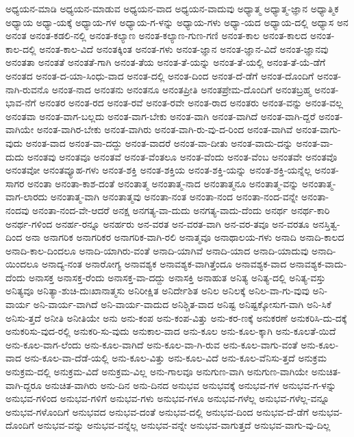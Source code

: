 {ಅಧ್ಯಯನ-ಮಾಡಿ
ಅಧ್ಯಯನ-ಮಾಡುವ
ಅಧ್ಯಯನ-ವಾದ
ಅಧ್ಯಯನ-ವಾದುವು
ಅಧ್ಯಾತ್ಮ
ಅಧ್ಯಾತ್ಮ-ಜ್ಞಾನ
ಅಧ್ಯಾತ್ಮಿಕ
ಅಧ್ಯಾಯ
ಅಧ್ಯಾ-ಯಕ್ಕೆ
ಅಧ್ಯಾಯ-ಗಳ
ಅಧ್ಯಾಯ-ಗ-ಳನ್ನು
ಅಧ್ಯಾಯ-ಗಳು
ಅಧ್ಯಾ-ಯದ
ಅಧ್ಯಾಯ-ದಲ್ಲಿ
ಅಧ್ಯಾಸ
ಅನ
ಅನಂತ
ಅನಂತ-ಕಡಲಿ-ನಲ್ಲಿ
ಅನಂತ-ಕಲ್ಯಾಣ
ಅನಂತ-ಕಲ್ಯಾಣ-ಗುಣ-ಗಣಿ
ಅನಂತ-ಕಾಲ
ಅನಂತ-ಕಾಲದ
ಅನಂತ-ಕಾಲ-ದಲ್ಲಿ
ಅನಂತ-ಕಾಲ-ವಿದೆ
ಅನಂತಕ್ಕಿಂತ
ಅನಂತ-ಗಳು
ಅನಂತ-ಜ್ಞಾನ
ಅನಂತ-ಜ್ಞಾನ-ವಿದೆ
ಅನಂತ-ಜ್ಞಾನವು
ಅನಂತತಾ
ಅನಂತತೆ
ಅನಂತತೆ-ಗಾಗಿ
ಅನಂತ-ತೆಯ
ಅನಂತ-ತೆ-ಯನ್ನು
ಅನಂತ-ತೆ-ಯಲ್ಲಿ
ಅನಂತ-ತೆ-ಯೆ-ಡೆಗೆ
ಅನಂತದ
ಅನಂತ-ದ-ಯಾ-ಸಿಂಧು-ವಾದ
ಅನಂತ-ದಲ್ಲಿ
ಅನಂತ-ದಿಂದ
ಅನಂತ-ದೆ-ಡೆಗೆ
ಅನಂತ-ದೊಂದಿಗೆ
ಅನಂತ-ನಾಗಿ-ರುವನೊ
ಅನಂತ-ನಾದ
ಅನಂತನು
ಅನಂತನೂ
ಅನಂತಪ್ರೀತಿ
ಅನಂತಪ್ರೇಮ-ದೊಂದಿಗೆ
ಅನಂತಬ್ರಹ್ಮ
ಅನಂತ-ಭಾವ-ನೆಗೆ
ಅನಂತರ
ಅನಂತ-ರದ
ಅನಂತ-ರವೆ
ಅನಂತ-ರವೇ
ಅನಂತ-ರಾದ
ಅನಂತರು
ಅನಂತ-ವನ್ನು
ಅನಂತ-ವಲ್ಲ
ಅನಂತವಾ
ಅನಂತ-ವಾಗ-ಬಲ್ಲದು
ಅನಂತ-ವಾಗ-ಬೇಕು
ಅನಂತ-ವಾಗಿ
ಅನಂತ-ವಾಗಿದೆ
ಅನಂತ-ವಾಗಿ-ದ್ದರೆ
ಅನಂತ-ವಾಗಿಯೇ
ಅನಂತ-ವಾಗಿರ-ಬೇಕು
ಅನಂತ-ವಾಗಿರು
ಅನಂತ-ವಾಗಿ-ರು-ವು-ದ-ರಿಂದ
ಅನಂತ-ವಾಗಿವೆ
ಅನಂತ-ವಾಗು-ವುದು
ಅನಂತ-ವಾದ
ಅನಂತ-ವಾ-ದದ್ದು
ಅನಂತ-ವಾದರೆ
ಅನಂತ-ವಾ-ದೀತು
ಅನಂತ-ವಾದು-ದನ್ನು
ಅನಂತ-ವಾ-ದುದು
ಅನಂತವು
ಅನಂತವೂ
ಅನಂತವೆ
ಅನಂತ-ವೆಂತಲೂ
ಅನಂತ-ವೆಂದು
ಅನಂತ-ವೆಂಬ
ಅನಂತವೇ
ಅನಂತವೊ
ಅನಂತವೋ
ಅನಂತವ್ಯೂಹ-ಗಳು
ಅನಂತ-ಶಕ್ತಿ
ಅನಂತ-ಶಕ್ತಿಯ
ಅನಂತ-ಶಕ್ತಿ-ಯನ್ನು
ಅನಂತ-ಶಕ್ತಿ-ಯನ್ನೆಲ್ಲ
ಅನಂತ-ಸಾಗರ
ಅನಂತಾ
ಅನಂತಾ-ಕಾಶ-ದಂತೆ
ಅನಂತಾತ್ಮ
ಅನಂತಾತ್ಮ-ನಾದ
ಅನಂತಾತ್ಮನೂ
ಅನಂತಾತ್ಮ-ವನ್ನು
ಅನಂತಾತ್ಮ-ವಾಗ-ಲಾರದು
ಅನಂತಾತ್ಮ-ವಾಗಿ
ಅನಂತಾತ್ಮವು
ಅನಂತಾ-ನಂತ
ಅನಂತಾ-ನಂದ
ಅನಂತಾ-ನಂದ-ವನ್ನೇ
ಅನಂತಾ-ನಂದವು
ಅನಂತಾ-ನಂದ-ವೇ-ಆದರೆ
ಅನಕ್ಷ
ಅನಗತ್ಯ-ವಾ-ದುದು
ಅನಗತ್ಯ-ವಾದು-ದೆಂದು
ಅನರ್ಥ
ಅನರ್ಥ-ಕಾರಿ
ಅನರ್ಥ-ಗಳಿಂದ
ಅನರ್ಹ-ರನ್ನೂ
ಅನರ್ಹರು
ಅನ-ವರತ
ಅನ-ವರತ-ವಾಗಿ
ಅನ-ವರ-ತವೂ
ಅನ-ವರತೂ
ಅನಸ್ತಿತ್ವ-ದಿಂದ
ಅನಾ
ಅನಾಗರಿಕ
ಅನಾಗರಿಕರ
ಅನಾಗರಿಕ-ವಾಗಿ-ರಲಿ
ಅನಾತ್ಮವೂ
ಅನಾಥಾಲಯ-ಗಳು
ಅನಾದಿ
ಅನಾದಿ-ಕಾಲದ
ಅನಾದಿ-ಕಾಲ-ದಿಂದಲೂ
ಅನಾದಿ-ಯಾಗಿರು-ವಂತೆ
ಅನಾದಿ-ಯಾಗಿವೆ
ಅನಾದಿ-ಯಾದ
ಅನಾದಿ-ಯಾದುವು
ಅನಾದಿ-ಯಿಂದಲೂ
ಅನಾದ್ಯ-ನಂತ
ಅನಾರೋಗ್ಯ
ಅನಾವಶ್ಯಕ
ಅನಾವಶ್ಯಕ-ವಾಗಿತ್ತೆಂದೂ
ಅನಾವಶ್ಯಕ-ವಾದ
ಅನಾವಶ್ಯಕ-ವಾದು-ದೆಂದು
ಅನಾಸಕ್ತ
ಅನಾಸಕ್ತ-ರೆಂದು
ಅನಾಸಕ್ತ-ವಾ-ದದ್ದು
ಅನಾಸಕ್ತಿ
ಅನಾಹುತ
ಅನಿತ್ಯ
ಅನಿತ್ಯ-ದಲ್ಲಿ
ಅನಿತ್ಯ-ವಸ್ತು
ಅನಿತ್ಯವೂ
ಅನಿತ್ಯಾ-ಶುಚಿ-ದುಃಖಾನಾತ್ಮಸು
ಅನಿರೀಕ್ಷಿತ
ಅನಿರ್ದೇಶಿತ
ಅನಿಲ
ಅನಿಲಕ್ಕೆ
ಅನಿಲ-ವಾ-ಗು-ವುವು
ಅನಿ-ವಾರ್ಯ
ಅನಿ-ವಾರ್ಯ-ವಾಗಿದೆ
ಅನಿ-ವಾರ್ಯ-ವಾದುದ
ಅನಿಶ್ಚಿತ-ವಾದ
ಅನಿಷ್ಟ
ಅನಿಷ್ಟಕ್ಕೋಸುಗ-ವಾಗಿ
ಅನಿ-ಸಿಕೆ
ಅನಿಸು-ತ್ತದೆ
ಅನೀತಿ
ಅನೀತಿಯೇ
ಅನು
ಅನು-ಕಂಪ
ಅನು-ಕಂಪ-ವಿತ್ತು
ಅನು-ಕರ-ಣಕ್ಕೆ
ಅನುಕರಣೆ
ಅನುಕರಿಸಿ-ದು-ದಕ್ಕೆ
ಅನುಕರಿಸು-ವುದ-ರಲ್ಲಿ
ಅನುಕರಿ-ಸು-ವುದು
ಅನುಕಾಲ-ವಾದ
ಅನು-ಕೂಲ
ಅನು-ಕೂಲ-ಕ್ಕಾಗಿ
ಅನು-ಕೂಲತೆ-ಯಿದೆ
ಅನು-ಕೂಲ-ವಾಗ-ಲೆಂದು
ಅನು-ಕೂಲ-ವಾಗಿದೆ
ಅನು-ಕೂಲ-ವಾ-ಗಿ-ರುವ
ಅನು-ಕೂಲ-ವಾಗು-ವಂತೆ
ಅನು-ಕೂಲ-ವಾದ
ಅನು-ಕೂಲ-ವಾ-ದೆಡೆ-ಯಲ್ಲಿ
ಅನು-ಕೂಲ-ವಿತ್ತು
ಅನು-ಕೂಲ-ವಿದೆ
ಅನು-ಕೂಲ-ವೆನಿಸು-ತ್ತದೆ
ಅನುಕ್ರಮ
ಅನುಕ್ರಮ-ದಲ್ಲಿ
ಅನುಕ್ರಮ-ವಿದೆ
ಅನುಕ್ರಮ-ವಿಲ್ಲ
ಅನು-ಗಾಲವೂ
ಅನುಗುಣ-ವಾಗಿ
ಅನುಗುಣ-ವಾಗಿಯೇ
ಅನುಚಿತ-ವಾಗಿ-ದ್ದರೂ
ಅನುಚಿತ-ವಾಗಿರು
ಅನು-ದಿನ
ಅನು-ದಿನದ
ಅನುಭವ
ಅನುಭವಕ್ಕೆ
ಅನುಭವ-ಗಳ
ಅನುಭವ-ಗ-ಳನ್ನು
ಅನುಭವ-ಗಳಿಂದ
ಅನುಭವ-ಗಳಿಗೆ
ಅನುಭವ-ಗಳು
ಅನುಭವ-ಗಳೂ
ಅನುಭವ-ಗಳೆಲ್ಲ
ಅನುಭವ-ಗಳೆಲ್ಲ-ವನ್ನೂ
ಅನುಭವ-ಗಳೊಂದಿಗೆ
ಅನುಭವದ
ಅನುಭವ-ದಂತೆ
ಅನುಭವ-ದಲ್ಲಿ
ಅನುಭವ-ದಿಂದ
ಅನುಭವ-ದೆ-ಡೆಗೆ
ಅನುಭವ-ದೊಂದಿಗೆ
ಅನುಭವ-ವನ್ನು
ಅನುಭವ-ವನ್ನೆಲ್ಲ
ಅನುಭವ-ವನ್ನೇ
ಅನುಭವ-ವಾಗುತ್ತದೆ
ಅನುಭವ-ವಾಗು-ವು-ದಿಲ್ಲ
}
